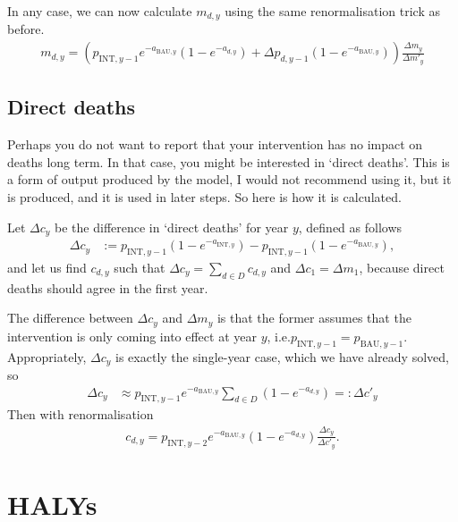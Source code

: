 \documentclass[]{article}
\begin{document}
In any case, we can now calculate $m_{d, y}$ using the same renormalisation trick as before.
\begin{align*}
	m_{d, y} = \left(p_{\text{INT}, y - 1} e^{-a_{\text{BAU}, y}} \left(1 - e^{-a_{d, y}}\right)
	+ \Delta p_{d, y - 1} \left(1 - e^{-a_{\text{BAU}, y}}\right) \right) \frac{\Delta m_y}{\Delta m'_y} 
\end{align*}

\subsection{Direct deaths}\label{sec:directDeath}

Perhaps you do not want to report that your intervention has no impact on deaths long term. In that case, you might be interested in `direct deaths'. This is a form of output produced by the model, I would not recommend using it, but it is produced, and it is used in later steps. So here is how it is calculated.

Let $\Delta c_y$ be the difference in `direct deaths' for year $y$, defined as follows
\begin{align*}
	\Delta c_y &:= p_{\text{INT}, y - 1} \left(1 - e^{-a_{\text{INT}, y}}\right) - p_{\text{INT}, y - 1} \left(1 - e^{-a_{\text{BAU}, y}}\right),
\end{align*}
and let us find $c_{d, y}$ such that $\Delta c_y = \sum_{d \in D} c_{d, y}$ and $\Delta c_1 = \Delta m_1$, because direct deaths should agree in the first year.

The difference between $\Delta c_y$ and $\Delta m_y$ is that the former assumes that the intervention is only coming into effect at year $y$, i.e.\@ $p_{\text{INT}, y-1} = p_{\text{BAU}, y-1}$. Appropriately, $\Delta c_y$ is exactly the single-year case, which we have already solved, so
\begin{align*}
	\Delta c_y &\approx p_{\text{INT}, y-1} e^{-a_{\text{BAU}, y}} \sum_{d \in D} \left(1 - e^{-a_{d, y}}\right) =: \Delta c'_y
\end{align*}
Then with renormalisation
\begin{align*}
	c_{d, y} = p_{\text{INT}, y-2} e^{-a_{\text{BAU}, y}} \left(1 - e^{-a_{d, y}}\right) \frac{\Delta c_y}{\Delta c'_y}.
\end{align*}

\section{HALYs}
\end{document}
